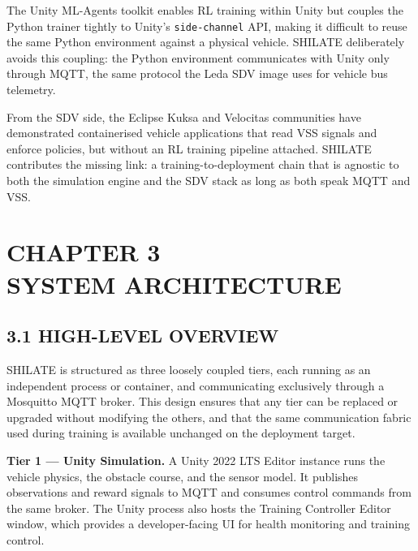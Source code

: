\documentclass[12pt,a4paper]{article}
\begin{document}
The Unity ML-Agents toolkit \cite{Juliani2020} enables RL training within
Unity but couples the Python trainer tightly to Unity's \texttt{side-channel}
API, making it difficult to reuse the same Python environment against a
physical vehicle. SHILATE deliberately avoids this coupling: the Python
environment communicates with Unity only through MQTT, the same protocol the
Leda SDV image uses for vehicle bus telemetry.

From the SDV side, the Eclipse Kuksa and Velocitas communities have
demonstrated containerised vehicle applications that read VSS signals and
enforce policies, but without an RL training pipeline attached. SHILATE
contributes the missing link: a training-to-deployment chain that is agnostic
to both the simulation engine and the SDV stack as long as both speak MQTT
and VSS.

\clearpage

\section*{\centering CHAPTER 3\\[0.3cm] SYSTEM ARCHITECTURE}
\vspace{2\baselineskip}

\subsection*{3.1 \quad HIGH-LEVEL OVERVIEW}

\indent SHILATE is structured as three loosely coupled tiers, each running as an
independent process or container, and communicating exclusively through a
Mosquitto MQTT broker. This design ensures that any tier can be replaced or
upgraded without modifying the others, and that the same communication fabric
used during training is available unchanged on the deployment target.

\textbf{Tier 1 — Unity Simulation.} A Unity 2022 LTS Editor instance runs the
vehicle physics, the obstacle course, and the sensor model. It publishes
observations and reward signals to MQTT and consumes control commands from the
same broker. The Unity process also hosts the Training Controller Editor
window, which provides a developer-facing UI for health monitoring and
training control.
\end{document}
